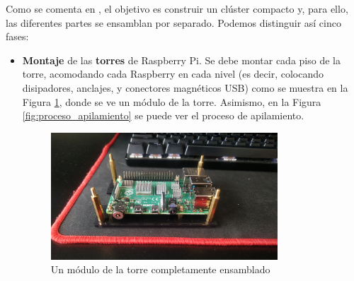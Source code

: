 Como se comenta en , el objetivo es construir un clúster compacto y, para ello, las diferentes partes se ensamblan por separado. Podemos distinguir así cinco fases:
\begin{itemize}
    \item \textbf{Montaje} de las \textbf{torres} de Raspberry Pi. Se debe montar cada piso de la torre, acomodando cada Raspberry en cada nivel (es decir, colocando disipadores, anclajes, y conectores magnéticos USB) como se muestra en la Figura \ref{fig:modulo_raspi_torre}, donde se ve un módulo de la torre. Asimismo, en la Figura \ref{fig:proceso_apilamiento} se puede ver el proceso de apilamiento.

    \begin{figure}[h!]
    \centering
    \includegraphics[width=0.8\textwidth]{img/modulo_raspi_torre.jpg}
    \caption{Un módulo de la torre completamente ensamblado}
    \label{fig:modulo_raspi_torre}
    \end{figure}


\end{itemize}

